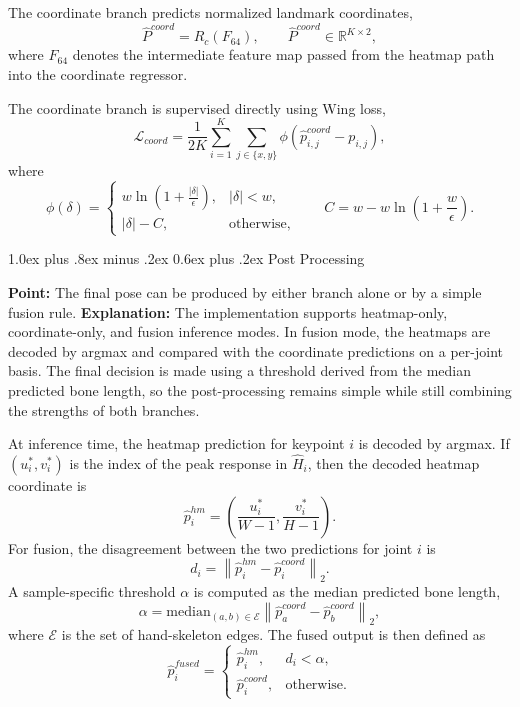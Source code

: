 \documentclass[10pt,letterpaper]{article}
\makeatletter
\renewcommand\subsection{\@startsection{subsection}{2}{\z@}%
  {1.0ex plus .8ex minus .2ex}%
  {0.6ex plus .2ex}%
  {\normalfont\itshape}}
\makeatother
\begin{document}
The coordinate branch predicts normalized landmark coordinates,
\[
\hat{P}^{coord} = R_c(F_{64}), \qquad \hat{P}^{coord} \in \mathbb{R}^{K \times 2},
\]
where $F_{64}$ denotes the intermediate feature map passed from the heatmap path into the coordinate regressor.

The coordinate branch is supervised directly using Wing loss,
\[
\mathcal{L}_{coord}
=
\frac{1}{2K}
\sum_{i=1}^{K}
\sum_{j \in \{x,y\}}
\phi\!\left(\hat{p}^{coord}_{i,j} - p_{i,j}\right),
\]
where
\[
\phi(\delta)=
\begin{cases}
w \ln\left(1 + \frac{|\delta|}{\epsilon}\right), & |\delta| < w, \\
|\delta| - C, & \text{otherwise,}
\end{cases}
\qquad
C = w - w \ln\left(1 + \frac{w}{\epsilon}\right).
\]

\subsection{Post Processing}

\noindent\textbf{Point:} The final pose can be produced by either branch alone or by a simple fusion rule.  
\textbf{Explanation:} The implementation supports heatmap-only, coordinate-only, and fusion inference modes. In fusion mode, the heatmaps are decoded by argmax and compared with the coordinate predictions on a per-joint basis. The final decision is made using a threshold derived from the median predicted bone length, so the post-processing remains simple while still combining the strengths of both branches.

At inference time, the heatmap prediction for keypoint $i$ is decoded by argmax. If $(u_i^*, v_i^*)$ is the index of the peak response in $\hat{H}_i$, then the decoded heatmap coordinate is
\[
\hat{p}^{hm}_i =
\left(
\frac{u_i^*}{W-1},
\frac{v_i^*}{H-1}
\right).
\]
For fusion, the disagreement between the two predictions for joint $i$ is
\[
d_i = \left\| \hat{p}^{hm}_i - \hat{p}^{coord}_i \right\|_2.
\]
A sample-specific threshold $\alpha$ is computed as the median predicted bone length,
\[
\alpha = \mathrm{median}_{(a,b)\in \mathcal{E}}
\left\| \hat{p}^{coord}_a - \hat{p}^{coord}_b \right\|_2,
\]
where $\mathcal{E}$ is the set of hand-skeleton edges. The fused output is then defined as
\[
\hat{p}^{fused}_i =
\begin{cases}
\hat{p}^{hm}_i, & d_i < \alpha, \\
\hat{p}^{coord}_i, & \text{otherwise.}
\end{cases}
\]
\end{document}
